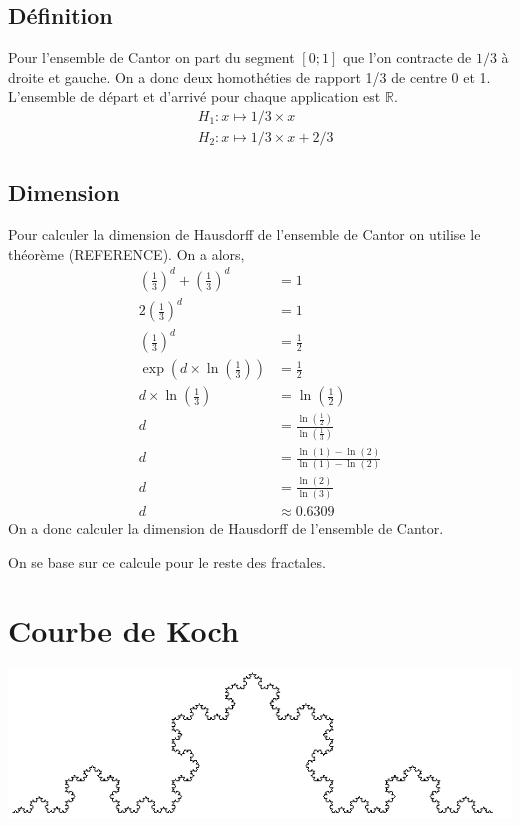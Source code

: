 \documentclass[a4paper, 12pt]{report}
\begin{document}
			\subsection{Définition}
				Pour l'ensemble de Cantor on part du segment $[0;1]$ que l'on contracte de $1/3$ à droite et gauche.
				On a donc deux homothéties de rapport 1/3 de centre 0 et 1. L'ensemble de départ et d'arrivé pour chaque application est $\mathds{R}.$ 
				\begin{align*}
					&H_1:x\mapsto 1/3\times x\\
					&H_2:x\mapsto 1/3\times x+2/3
				\end{align*}
			\subsection{Dimension}
				Pour calculer la dimension de Hausdorff de l'ensemble de Cantor on utilise le théorème (REFERENCE). On a alors,
				\begin{align*}
					\left(\frac{1}{3}\right)^d+\left(\frac{1}{3}\right)^d	&=1\\
											  2\left(\frac{1}{3}\right)^d	&=1\\
											   \left(\frac{1}{3}\right)^d	&=\frac{1}{2}\\
						\exp\left(d\times\ln\left(\frac{1}{3}\right)\right)	&=\frac{1}{2} \tag{Passage à la forme exponentielle}\\
										d\times\ln\left(\frac{1}{3}\right)	&=\ln\left(\frac{1}{2}\right)\\
																		d	&=\frac{\ln\left(\frac{1}{2}\right)}{\ln\left(\frac{1}{3}\right)}\\
																		d	&=\frac{\ln(1)-\ln(2)}{\ln(1)-\ln(2)}\\
																		d	&=\frac{\ln(2)}{\ln(3)} \tag{$\ln(1)$=0}\\
																		d	&\approx 0.6309
				\end{align*}
				On a donc calculer la dimension de Hausdorff de l'ensemble de Cantor.
				
				
				On se base sur ce calcule pour le reste des fractales.
\newpage
		\section{Courbe de Koch}
			\includegraphics[scale=0.9]{Images/courbe}
\end{document}
